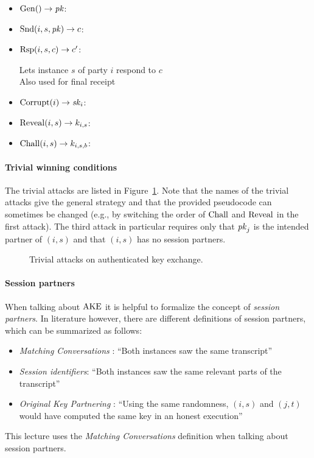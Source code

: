 \setlength\itemizeskip{3.5cm}
\begin{itemize}
    \item $\mathrm{Gen}() \to \mathit{pk}$:\hfill{}
    \item $\mathrm{Snd}(i, s, \mathit{pk}) \to c$:\hfill{}
    \item $\mathrm{Rsp}(i,s,c)\to c'$:\hfill\parbox[t][][l]{\linewidth-\itemizeskip}{Lets instance $s$ of party $i$ respond to $c$\\Also used for final receipt}
    \item $\mathrm{Corrupt}(i)\to\mathit{sk}_i$:\hfill{}
    \item $\mathrm{Reveal}(i,s)\to k_{i,s}$:\hfill{} 
    \item $\mathrm{Chall}(i,s)\to k_{i,s,b}$:\hfill{}
\end{itemize}

\paragraph{Trivial winning conditions} The trivial attacks are listed in Figure~\ref{fig:ake:trivial}. 
Note that the names of the trivial attacks give the general strategy and that the provided pseudocode can sometimes be changed (e.g., by switching the order of $\mathrm{Chall}$ and $\mathrm{Reveal}$ in the first attack).
The third attack in particular requires only that $\mathit{pk}_j$ is the intended partner of $(i,s)$ and that $(i,s)$ has no session partners.

\begin{figure}[!ht]
    \centering
    
    \caption{Trivial attacks on authenticated key exchange.}
    \label{fig:ake:trivial}
\end{figure}

\paragraph{Session partners} When talking about $\mathrm{AKE}$ it is helpful to formalize the concept of \emph{session partners}. 
In literature however, there are different definitions of session partners, which can be summarized as follows:
\begin{itemize}
    \item \emph{Matching Conversations} \cite{C:BelRog93}: ``Both instances saw the same transcript''
    \item \emph{Session identifiers}: ``Both instances saw the same relevant parts of the transcript''
    \item \emph{Original Key Partnering} \cite{EPRINT:LiSch17}: ``Using the same randomness, $(i,s)$ and $(j,t)$ would have computed the same key in an honest execution''
\end{itemize}
This lecture uses the \emph{Matching Conversations} definition when talking about session partners.

